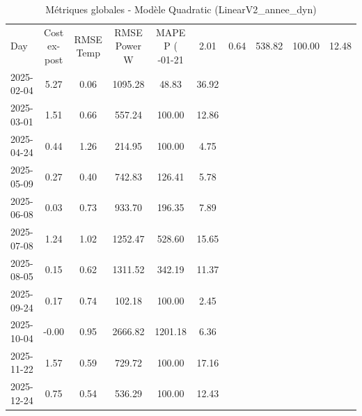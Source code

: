 \begin{table}
\caption{Métriques globales - Modèle Quadratic (LinearV2_annee_dyn)}
\label{tab:Quadratic_LinearV2_annee_dyn_Validation_EPlus_sans_Opti}
\begin{small}
\begin{tabular}{lccccc}
\toprule
Day & Cost ex-post & RMSE Temp & RMSE Power W & MAPE P (%
-01-21 & 2.01 & 0.64 & 538.82 & 100.00 & 12.48 \\
2025-02-04 & 5.27 & 0.06 & 1095.28 & 48.83 & 36.92 \\
2025-03-01 & 1.51 & 0.66 & 557.24 & 100.00 & 12.86 \\
2025-04-24 & 0.44 & 1.26 & 214.95 & 100.00 & 4.75 \\
2025-05-09 & 0.27 & 0.40 & 742.83 & 126.41 & 5.78 \\
2025-06-08 & 0.03 & 0.73 & 933.70 & 196.35 & 7.89 \\
2025-07-08 & 1.24 & 1.02 & 1252.47 & 528.60 & 15.65 \\
2025-08-05 & 0.15 & 0.62 & 1311.52 & 342.19 & 11.37 \\
2025-09-24 & 0.17 & 0.74 & 102.18 & 100.00 & 2.45 \\
2025-10-04 & -0.00 & 0.95 & 2666.82 & 1201.18 & 6.36 \\
2025-11-22 & 1.57 & 0.59 & 729.72 & 100.00 & 17.16 \\
2025-12-24 & 0.75 & 0.54 & 536.29 & 100.00 & 12.43 \\
\bottomrule
\end{tabular}
\end{small}
\end{table}
